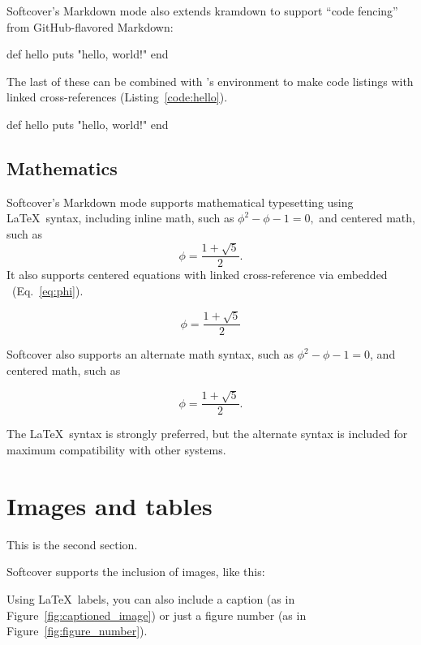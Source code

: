Softcover's Markdown mode also extends kramdown to support ``code fencing'' from GitHub-flavored Markdown:

\begin{code}
def hello
  puts "hello, world!"
end
\end{code}

The last of these can be combined with \PolyTeX's  environment to make code listings with linked cross-references (Listing~\ref{code:hello}).

\begin{codelisting}
\label{code:hello}
\begin{code}
def hello
  puts "hello, world!"
end
\end{code}
\end{codelisting}

\subsection{Mathematics}

Softcover's Markdown mode supports mathematical typesetting using \LaTeX\ syntax, including inline math, such as \( \phi^2 - \phi - 1 = 0, \) and centered math, such as
\[ \phi = \frac{1+\sqrt{5}}{2}. \]
It also supports centered equations with linked cross-reference via embedded \PolyTeX\ (Eq.~\eqref{eq:phi}).

\begin{equation}
\label{eq:phi}
\phi = \frac{1+\sqrt{5}}{2}
\end{equation}

Softcover also supports an alternate math syntax, such as \(\phi^2 - \phi - 1 = 0\), and centered math, such as

\[\phi = \frac{1+\sqrt{5}}{2}.\]

The \LaTeX\ syntax is strongly preferred, but the alternate syntax is included for maximum compatibility with other systems.

\section{Images and tables}

This is the second section.

Softcover supports the inclusion of images, like this:


Using \LaTeX\ labels, you can also include a caption (as in Figure~\ref{fig:captioned_image}) or just a figure number (as in Figure~\ref{fig:figure_number}).

